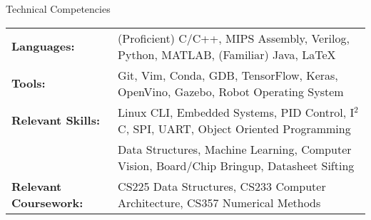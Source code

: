 \documentclass{resume} %
\begin{document}

    \begin{rSection} {Technical Competencies}

        \begin{tabular}{ @{} >{\bfseries}l @{\hspace{2ex}} l }

        Languages: & (Proficient) C/C++, MIPS Assembly, Verilog, Python, MATLAB, (Familiar) Java, LaTeX\\
        Tools: & Git, Vim, Conda, GDB, TensorFlow, Keras, OpenVino, Gazebo, Robot Operating System \\
        Relevant Skills: & Linux CLI, Embedded Systems, PID Control, I$^2$C, SPI, UART, Object Oriented Programming \\ & Data Structures, Machine Learning, Computer Vision, Board/Chip Bringup, Datasheet Sifting \\
		Relevant Coursework: & CS225 Data Structures, CS233 Computer Architecture, CS357 Numerical Methods \\

        \end{tabular}

    \end{rSection}


\end{document}
